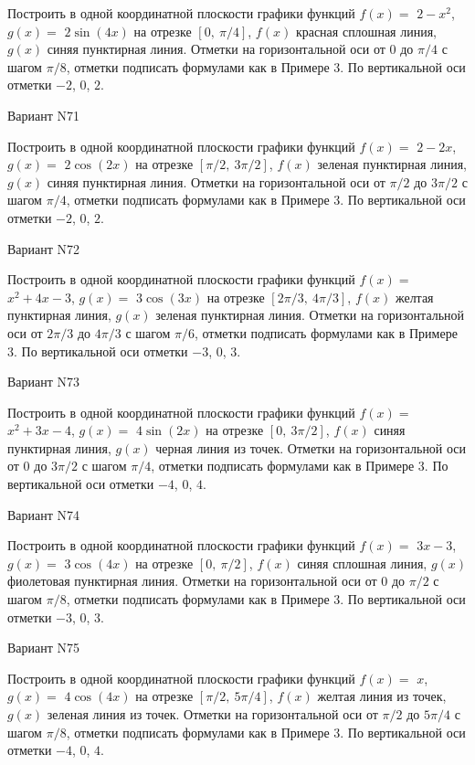 \documentclass[11pt]{report}
\begin{document}
Построить в одной координатной плоскости графики функций $f(x) = $
    $2 - x^{2}$, $g(x) = $
    $2 \sin{\left(4 x \right)}$ на 
    отрезке $\left[ 0, \  \pi / 4\right]$, $f(x)$ красная 
    сплошная линия, $g(x)$ синяя пунктирная линия. 
    Отметки на горизонтальной оси от $0$ до $\pi / 4$ с 
    шагом $\pi / 8$, отметки подписать формулами как в Примере 3.  
    По вертикальной оси отметки $-2$, 0, $2$.

Вариант N71

Построить в одной координатной плоскости графики функций $f(x) = $
    $2 - 2 x$, $g(x) = $
    $2 \cos{\left(2 x \right)}$ на 
    отрезке $\left[ \pi / 2, \  3 \pi / 2\right]$, $f(x)$ зеленая 
    пунктирная линия, $g(x)$ синяя пунктирная линия. 
    Отметки на горизонтальной оси от $\pi / 2$ до $3 \pi / 2$ с 
    шагом $\pi / 4$, отметки подписать формулами как в Примере 3.  
    По вертикальной оси отметки $-2$, 0, $2$.

Вариант N72

Построить в одной координатной плоскости графики функций $f(x) = $
    $x^{2} + 4 x - 3$, $g(x) = $
    $3 \cos{\left(3 x \right)}$ на 
    отрезке $\left[ 2 \pi / 3, \  4 \pi / 3\right]$, $f(x)$ желтая 
    пунктирная линия, $g(x)$ зеленая пунктирная линия. 
    Отметки на горизонтальной оси от $2 \pi / 3$ до $4 \pi / 3$ с 
    шагом $\pi / 6$, отметки подписать формулами как в Примере 3.  
    По вертикальной оси отметки $-3$, 0, $3$.

Вариант N73

Построить в одной координатной плоскости графики функций $f(x) = $
    $x^{2} + 3 x - 4$, $g(x) = $
    $4 \sin{\left(2 x \right)}$ на 
    отрезке $\left[ 0, \  3 \pi / 2\right]$, $f(x)$ синяя 
    пунктирная линия, $g(x)$ черная линия из точек. 
    Отметки на горизонтальной оси от $0$ до $3 \pi / 2$ с 
    шагом $\pi / 4$, отметки подписать формулами как в Примере 3.  
    По вертикальной оси отметки $-4$, 0, $4$.

Вариант N74

Построить в одной координатной плоскости графики функций $f(x) = $
    $3 x - 3$, $g(x) = $
    $3 \cos{\left(4 x \right)}$ на 
    отрезке $\left[ 0, \  \pi / 2\right]$, $f(x)$ синяя 
    сплошная линия, $g(x)$ фиолетовая пунктирная линия. 
    Отметки на горизонтальной оси от $0$ до $\pi / 2$ с 
    шагом $\pi / 8$, отметки подписать формулами как в Примере 3.  
    По вертикальной оси отметки $-3$, 0, $3$.

Вариант N75

Построить в одной координатной плоскости графики функций $f(x) = $
    $x$, $g(x) = $
    $4 \cos{\left(4 x \right)}$ на 
    отрезке $\left[ \pi / 2, \  5 \pi / 4\right]$, $f(x)$ желтая 
    линия из точек, $g(x)$ зеленая линия из точек. 
    Отметки на горизонтальной оси от $\pi / 2$ до $5 \pi / 4$ с 
    шагом $\pi / 8$, отметки подписать формулами как в Примере 3.  
    По вертикальной оси отметки $-4$, 0, $4$.
\end{document}
